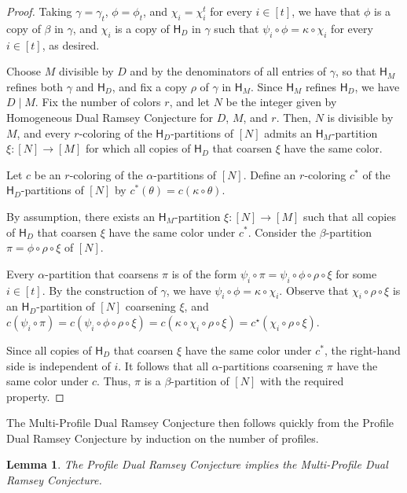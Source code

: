 \documentclass[11pt]{article}
\newcommand{\unif}[1]{\mathsf H_{#1}}
\newtheorem{lemma}[theorem]{Lemma}
\theoremstyle{remark}
\begin{document}
\begin{proof}
Taking $\gamma=\gamma_t$, $\phi=\phi_t$, and $\chi_i=\chi_i^t$ for every $i\in[t]$, we have that $\phi$ is a copy of $\beta$ in $\gamma$, and $\chi_i$ is a copy of $\unif{D}$ in $\gamma$ such that $\psi_i\circ\phi=\kappa\circ\chi_i$ for every $i\in[t]$, as desired.

Choose $M$ divisible by $D$ and by the denominators of all entries of $\gamma$, so that $\unif{M}$ refines both $\gamma$ and $\unif{D}$, and fix a copy $\rho$ of $\gamma$ in $\unif{M}$.
Since $\unif{M}$ refines $\unif{D}$, we have $D \mid M$.
Fix the number of colors $r$, and let $N$ be the integer given by Homogeneous Dual Ramsey Conjecture for $D$, $M$, and $r$.
Then, $N$ is divisible by $M$, and every $r$-coloring of the $\unif{D}$-partitions of $[N]$ admits an $\unif{M}$-partition $\xi\colon[N]\to[M]$ for which all copies of $\unif{D}$ that coarsen $\xi$ have the same color.

Let $c$ be an $r$-coloring of the $\alpha$-partitions of $[N]$. 
Define an $r$-coloring $c^*$ of the $\unif{D}$-partitions of $[N]$ by $c^*(\theta)=c(\kappa \circ \theta)$.

By assumption, there exists an $\unif{M}$-partition $\xi\colon[N]\to[M]$ such that all copies of $\unif{D}$ that coarsen $\xi$ have the same color under $c^*$.
Consider the $\beta$-partition $\pi=\phi\circ\rho\circ\xi$ of $[N]$.

Every $\alpha$-partition that coarsens $\pi$ is of the form $\psi_i \circ \pi = \psi_i\circ\phi\circ\rho\circ\xi$ for some $i\in[t]$. 
By the construction of $\gamma$, we have $\psi_i\circ\phi=\kappa\circ\chi_i$. 
Observe that $\chi_i\circ\rho\circ\xi$ is an $\unif{D}$-partition of $[N]$ coarsening $\xi$, and
$c(\psi_i\circ\pi)=c(\psi_i\circ\phi\circ\rho\circ\xi)=c(\kappa\circ\chi_i\circ\rho\circ\xi)=c^\star(\chi_i\circ\rho\circ\xi)$.

Since all copies of $\unif{D}$ that coarsen $\xi$ have the same color under $c^*$, the right-hand side is independent of $i$. It follows that all $\alpha$-partitions coarsening $\pi$ have the same color under $c$. Thus, $\pi$ is a $\beta$-partition of $[N]$ with the required property.
\end{proof}

The Multi-Profile Dual Ramsey Conjecture then follows quickly from the Profile Dual Ramsey Conjecture by induction on the number of profiles.

\begin{lemma}\label{lem:pdr-implies-mpdr}
    The Profile Dual Ramsey Conjecture implies the Multi-Profile Dual Ramsey Conjecture.
\end{lemma}
\end{document}
